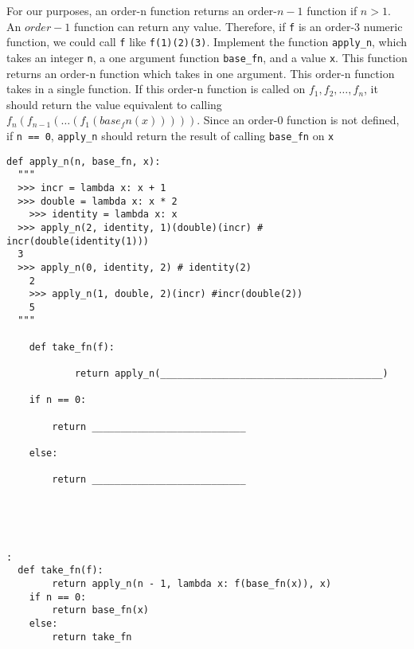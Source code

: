 \begin{blocksection}
\question 
For our purposes, an order-n function returns an order-$n-1$ function if $n > 1$. An $order-1$ function can return any value. 
\newline
Therefore, if \texttt{f} is an order-3 numeric function, we could call \texttt{f} like \lstinline{f(1)(2)(3)}. 
\newline
Implement the function \texttt{apply\_n}, which takes an integer \texttt{n}, a one argument function \texttt{base\_fn},
and a value \texttt{x}. This function returns an order-n function which takes in one argument. This order-n function takes in
a single function. If this order-n function is called on $f_1, f_2, \ldots, f_n$, it should return the value equivalent to calling
$f_n(f_{n - 1}(\ldots (f_1(base_fn(x)))))$. Since an order-0 function is not defined, if \texttt{n == 0}, \texttt{apply\_n} should return the result of calling
\texttt{base\_fn} on \texttt{x}
\begin{lstlisting}
def apply_n(n, base_fn, x): 
  """ 
  >>> incr = lambda x: x + 1
  >>> double = lambda x: x * 2
	>>> identity = lambda x: x
  >>> apply_n(2, identity, 1)(double)(incr) # incr(double(identity(1)))
  3
  >>> apply_n(0, identity, 2) # identity(2)
	2
	>>> apply_n(1, double, 2)(incr) #incr(double(2))
	5
  """
	
	def take_fn(f):
	    
			return apply_n(_______________________________________)
			
	if n == 0:
	
	    return ___________________________
			
	else:
	
	    return ___________________________
	    
			

				
\end{lstlisting}

\begin{solution}[1in]
\begin{lstlisting}:
  def take_fn(f):
	    return apply_n(n - 1, lambda x: f(base_fn(x)), x)
	if n == 0:
	    return base_fn(x)
	else:
	    return take_fn
\end{lstlisting}
\end{solution}
\end{blocksection}
